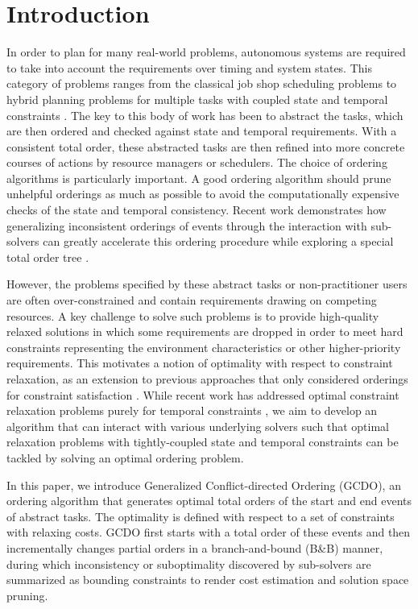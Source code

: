 \documentclass[letterpaper]{article} %
\theoremstyle{definition}
\begin{document}
\section{Introduction}

In order to plan for many real-world problems, autonomous systems are required to take into account the requirements over timing and system states. This category of problems ranges from the classical job shop scheduling problems \cite{manne1960job} to hybrid planning problems for multiple tasks with coupled state and temporal constraints \cite{wang2015tburton}. The key to this body of work has been to abstract the tasks, which are then ordered and checked against state and temporal requirements. With a consistent total order, these abstracted tasks are then refined into more concrete courses of actions by resource managers or schedulers. The choice of ordering algorithms is particularly important. A good ordering algorithm should prune unhelpful orderings as much as possible to avoid the computationally expensive checks of the state and temporal consistency. Recent work demonstrates how generalizing inconsistent orderings of events through the interaction with sub-solvers can greatly accelerate this ordering procedure while exploring a special total order tree \cite{wang2015,chen2019efficiently}.


However, the problems specified by these abstract tasks or non-practitioner users are often over-constrained and contain requirements drawing on competing resources. A key challenge to solve such problems is to provide high-quality relaxed solutions in which some requirements are dropped in order to meet hard constraints representing the environment characteristics or other higher-priority requirements. This motivates a notion of optimality with respect to constraint relaxation, as an extension to previous approaches that only considered orderings for constraint satisfaction \cite{wang2015,chen2019efficiently}. While recent work has addressed optimal constraint relaxation problems purely for temporal constraints \cite{yu2013continuously}, we aim to develop an algorithm that can interact with various underlying solvers such that optimal relaxation problems with tightly-coupled state and temporal constraints can be tackled by solving an optimal ordering problem.

In this paper, we introduce Generalized Conflict-directed Ordering (GCDO), an ordering algorithm that generates optimal total orders of the start and end events of abstract tasks. The optimality is defined with respect to a set of constraints with relaxing costs.  GCDO first starts with a total order of these events and then incrementally changes partial orders in a branch-and-bound (B\&B) manner, during which inconsistency or suboptimality discovered by sub-solvers are summarized as bounding constraints to render cost estimation and solution space pruning.
\end{document}

